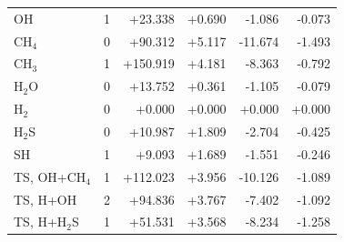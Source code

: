 \begin{tabular}{@{}lc rr rr@{}}
OH & 1 & \textcolor{pyscfred}{+23.338} & \textcolor{pyscfred}{+0.690} & \textcolor{pyscfred}{-1.086} & \textcolor{pyscfred}{-0.073} \\
CH$_4$ & 0 & \textcolor{pyscfred}{+90.312} & \textcolor{pyscfred}{+5.117} & \textcolor{pyscfred}{-11.674} & \textcolor{pyscfred}{-1.493} \\
CH$_3$ & 1 & \textcolor{pyscfred}{+150.919} & \textcolor{pyscfred}{+4.181} & \textcolor{pyscfred}{-8.363} & \textcolor{pyscfred}{-0.792} \\
H$_2$O & 0 & \textcolor{pyscfred}{+13.752} & \textcolor{pyscfred}{+0.361} & \textcolor{pyscfred}{-1.105} & \textcolor{pyscfred}{-0.079} \\
H$_2$ & 0 & \textcolor{pyscfred}{+0.000} & \textcolor{pyscfred}{+0.000} & \textcolor{pyscfred}{+0.000} & \textcolor{pyscfred}{+0.000} \\
H$_2$S & 0 & \textcolor{pyscfred}{+10.987} & \textcolor{pyscfred}{+1.809} & \textcolor{pyscfred}{-2.704} & \textcolor{pyscfred}{-0.425} \\
SH & 1 & \textcolor{pyscfred}{+9.093} & \textcolor{pyscfred}{+1.689} & \textcolor{pyscfred}{-1.551} & \textcolor{pyscfred}{-0.246} \\
TS, OH+CH$_4$ & 1 & \textcolor{pyscfred}{+112.023} & \textcolor{pyscfred}{+3.956} & \textcolor{pyscfred}{-10.126} & \textcolor{pyscfred}{-1.089} \\
TS, H+OH & 2 & \textcolor{pyscfred}{+94.836} & \textcolor{pyscfred}{+3.767} & \textcolor{pyscfred}{-7.402} & \textcolor{pyscfred}{-1.092} \\
TS, H+H$_2$S & 1 & \textcolor{pyscfred}{+51.531} & \textcolor{pyscfred}{+3.568} & \textcolor{pyscfred}{-8.234} & \textcolor{pyscfred}{-1.258} \\
\bottomrule
\end{tabular}
